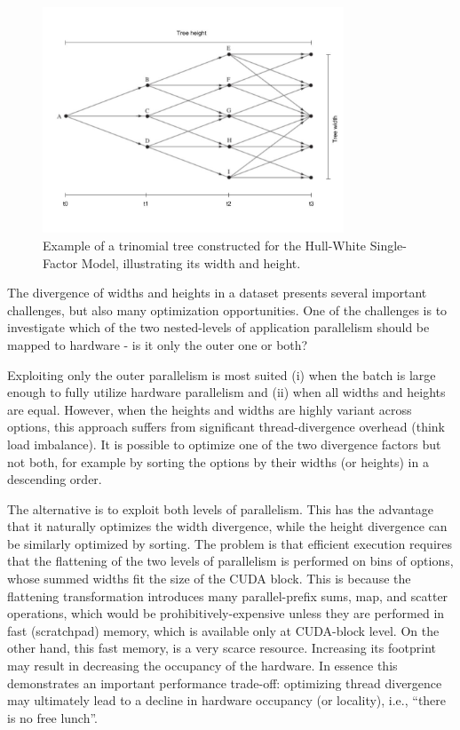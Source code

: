 \begin{figure}[H]
	\centering
	\includegraphics[width=0.8\textwidth]{img/treeconststage1wh.jpg}
	\caption{Example of a trinomial tree constructed for the Hull-White Single-Factor Model, illustrating its width and height.}
	\label{fig:intro:tree}
\end{figure}

The divergence of widths and heights in a dataset presents several important challenges, but also many optimization opportunities. One of the challenges is to investigate which of the two nested-levels of application parallelism should be mapped to hardware - is it only the outer one or both? 

Exploiting only the outer parallelism is most suited (i) when the batch is large enough to fully utilize hardware parallelism and (ii) when all widths and heights are equal. However, when the heights and widths are highly variant across options, this approach suffers from significant thread-divergence overhead (think load imbalance). It is possible to optimize one of the two divergence factors but not both, for example by sorting the options by their widths (or heights) in a descending order.

The alternative is to exploit both levels of parallelism. This has the advantage that it naturally optimizes the width divergence, while the height divergence can be similarly optimized by sorting.   The problem is that efficient execution requires that the flattening of the two levels of parallelism is performed on bins of options, whose summed widths fit the size of the CUDA block. This is because the flattening transformation introduces many parallel-prefix sums, map, and scatter operations, which would be prohibitively-expensive unless they are performed in fast (scratchpad) memory, which is available only at CUDA-block level. On the other hand, this fast memory, is a very scarce resource. Increasing its footprint may result in decreasing the occupancy of the hardware. In essence this demonstrates an important performance trade-off: optimizing thread divergence may ultimately lead to a decline in hardware occupancy (or locality), i.e., \enquote{there is no free lunch}.

